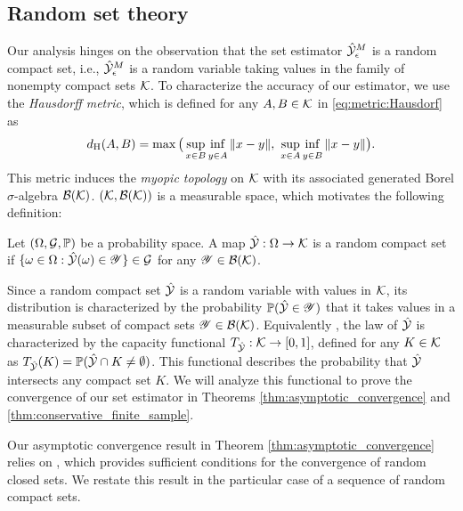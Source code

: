 \documentclass[12pt]{l4dc2022} %
\begin{document}
\subsection{Random set theory}

Our analysis hinges on the observation that the set estimator $\hat{\mathcal{Y}}_\epsilon^M$ is a random compact set, i.e., $\hat{\mathcal{Y}}_\epsilon^M$ is a random variable taking values in the family of nonempty compact sets $\mathcal{K}$.  
% 
To characterize the accuracy of
our estimator,
we use the \textit{Hausdorff metric}, which is defined for any $A,B\in\mathcal{K}$  in \eqref{eq:metric:Hausdorf} as 
\begin{equation}%
d_\textrm{H}(A,B)
=
\max\big(
\sup_{x\in B}
\Inf_{y\in A}
\|x-y\|, \
\sup_{x\in A}
\Inf_{y\in B}
\|x-y\|
\big).
\end{equation}
% 
This metric induces the \textit{myopic topology} on $\mathcal{K}$ \citep{Molchanov_BookTheoryOfRandomSets2017} with its associated generated Borel $\sigma$-algebra $\mathcal{B}(\mathcal{K})$. 
$(\mathcal{K},\mathcal{B}(\mathcal{K}))$ is a measurable space, which motivates the following definition:


\begin{definition}\label{def:random_compact_set}
Let $(\Omega,\mathcal{G},\mathbb{P})$ be a probability space. A map $\hat{\mathcal{Y}}:\Omega\rightarrow\mathcal{K}$ is a random compact set if $\{\omega\in\Omega : \hat{\mathcal{Y}}(\omega)\in\mathscr{Y}\}\in\mathcal{G}$ for any $\mathscr{Y}\in\mathcal{B}(\mathcal{K})$.
\end{definition}
Since a random compact set $\hat{\mathcal{Y}}$ is a random variable with values in $\mathcal{K}$, 
its distribution is characterized by the probability $\mathbb{P}(\hat{\mathcal{Y}}\in\mathscr{Y})$ that it takes values in a measurable subset of compact sets  $\mathscr{Y}\in\mathcal{B}(\mathcal{K})$. %
% 
% 
Equivalently \citep{Molchanov_BookTheoryOfRandomSets2017}, %
the law of $\hat{\mathcal{Y}}$ is %
characterized by the capacity functional $T_{\hat{\mathcal{Y}}}:\mathcal{K}\rightarrow[0,1]$, defined for any $K\in\mathcal{K}$ as 
$
T_{\hat{\mathcal{Y}}}(K)=
\mathbb{P}(\hat{\mathcal{Y}} \cap K\neq \emptyset)
$. 
This %
functional describes the probability that $\hat{\mathcal{Y}}$ intersects any compact set $K$. We will analyze this functional to prove the convergence of our set estimator in Theorems \ref{thm:asymptotic_convergence} and \ref{thm:conservative_finite_sample}. 

Our asymptotic convergence result in Theorem \ref{thm:asymptotic_convergence} relies on \citep[Proposition 1.7.23]{Molchanov_BookTheoryOfRandomSets2017}, which provides sufficient conditions for the convergence of random closed sets. 
We restate this result in the particular case of a sequence of random compact sets.
\end{document}
